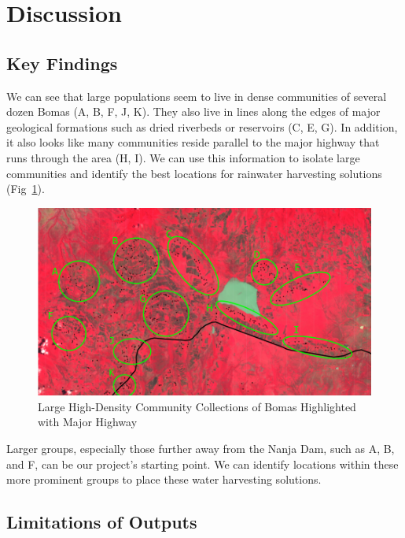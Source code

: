 \documentclass[10pt]{article}
\begin{document}
\section{Discussion}

\subsection{Key Findings}

We can see that large populations seem to live in dense communities of several dozen Bomas (A, B, F, J, K). They also live in lines along the edges of major geological formations such as dried riverbeds or reservoirs (C, E, G). In addition, it also looks like many communities reside parallel to the major highway that runs through the area (H, I). We can use this information to isolate large communities and identify the best locations for rainwater harvesting solutions (Fig~\ref{fig:Communities and Major Highway}).

\begin{figure} [H]
    \centering
    \includegraphics[width=1\linewidth]{images/Communities and Highway Highlighted.png}
    \caption{Large High-Density Community Collections of Bomas Highlighted with Major Highway}
    \label{fig:Communities and Major Highway}
\end{figure}

Larger groups, especially those further away from the Nanja Dam, such as A, B, and F, can be our project's starting point. We can identify locations within these more prominent groups to place these water harvesting solutions. 

\subsection{Limitations of Outputs}
\end{document}
